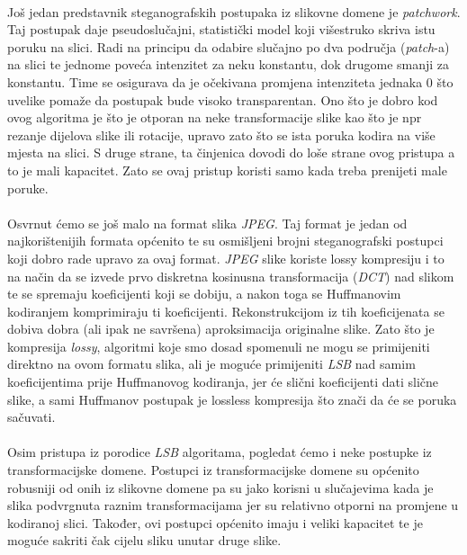\documentclass[times, utf8, seminar, numeric]{fer}
\begin{document}
\paragraph{}
Još jedan predstavnik steganografskih postupaka iz slikovne domene je \textit{patchwork}. Taj postupak daje pseudoslučajni, statistički model koji višestruko skriva istu poruku na slici. Radi na principu da odabire slučajno po dva područja (\textit{patch}-a) na slici te jednome poveća intenzitet za neku konstantu, dok drugome smanji za konstantu. Time se osigurava da je očekivana promjena intenziteta jednaka 0 što uvelike pomaže da postupak bude visoko transparentan. Ono što je dobro kod ovog algoritma je što je otporan na neke transformacije slike kao što je npr rezanje dijelova slike ili rotacije, upravo zato što se ista poruka kodira na više mjesta na slici. S druge strane, ta činjenica dovodi do loše strane ovog pristupa a to je mali kapacitet. Zato se ovaj pristup koristi samo kada treba prenijeti male poruke.
\paragraph{}
Osvrnut ćemo se još malo na format slika \textit{JPEG}. Taj format je jedan od najkorištenijih formata općenito te su osmišljeni brojni steganografski postupci koji dobro rade upravo za ovaj format. \textit{JPEG} slike koriste lossy kompresiju i to na način da se izvede prvo diskretna kosinusna transformacija (\textit{DCT}) nad slikom te se spremaju koeficijenti koji se dobiju, a nakon toga se Huffmanovim kodiranjem komprimiraju ti koeficijenti. Rekonstrukcijom iz tih koeficijenata se dobiva dobra (ali ipak ne savršena) aproksimacija originalne slike. Zato što je kompresija \textit{lossy}, algoritmi koje smo dosad spomenuli ne mogu se primijeniti direktno na ovom formatu slika, ali je moguće primijeniti \textit{LSB} nad samim koeficijentima prije Huffmanovog kodiranja, jer će slični koeficijenti dati slične slike, a sami Huffmanov postupak je lossless kompresija što znači da će se poruka sačuvati.
\paragraph{}
Osim pristupa iz porodice \textit{LSB} algoritama, pogledat ćemo i neke postupke iz transformacijske domene. Postupci iz transformacijske domene su općenito robusniji od onih iz slikovne domene pa su jako korisni u slučajevima kada je slika podvrgnuta raznim transformacijama jer su relativno otporni na promjene u kodiranoj slici. Također, ovi postupci općenito imaju i veliki kapacitet te je moguće sakriti čak cijelu sliku unutar druge slike.
\end{document}
